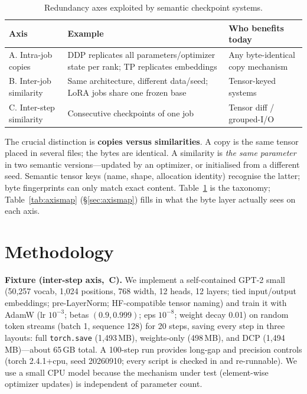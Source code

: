 \documentclass[sigconf,10pt,anonymous,review]{acmart}
\begin{document}
\begin{table}[t]
\caption{Redundancy axes exploited by semantic checkpoint systems.}
\label{tab:taxonomy}
\small
\begin{tabular}{p{1.1cm}p{3.05cm}p{2.9cm}}
\toprule
\textbf{Axis} & \textbf{Example} & \textbf{Who benefits today} \\
\midrule
A. Intra-job copies & DDP replicates all parameters/optimizer state per
rank; TP replicates embeddings & Any byte-identical copy mechanism \\
B. Inter-job similarity & Same architecture, different data/seed; LoRA
jobs share one frozen base & Tensor-keyed systems~\cite{adacheck} \\
C. Inter-step similarity & Consecutive checkpoints of one job & Tensor
diff / grouped-I/O~\cite{adacheck,aiturbo} \\
\bottomrule
\end{tabular}
\end{table}

The crucial distinction is \textbf{copies versus similarities}. A copy is
the same tensor placed in several files; the bytes are identical. A
similarity is \emph{the same parameter} in two semantic versions---updated
by an optimizer, or initialised from a different seed. Semantic tensor
keys (name, shape, allocation identity) recognise the latter; byte
fingerprints can only match exact content. Table~\ref{tab:taxonomy} is the
taxonomy; Table~\ref{tab:axismap} (\S\ref{sec:axismap}) fills in what the
byte layer actually sees on each axis.

\section{Methodology}
\label{sec:methodology}

\textbf{Fixture (inter-step axis,~C).} We implement a self-contained
GPT-2 small (50,257 vocab, 1,024 positions, 768 width, 12 heads, 12
layers; tied input/output embeddings; pre-LayerNorm; HF-compatible tensor
naming) and train it with AdamW (lr $10^{-3}$; betas $(0.9, 0.999)$;
eps $10^{-8}$; weight decay 0.01) on random token streams (batch 1,
sequence 128) for 20 steps, saving every step in three layouts: full
\texttt{torch.save} (1,493\,MB), weights-only (498\,MB), and DCP
(1,494\,MB)---about 65\,GB total. A 100-step run provides long-gap and
precision controls (torch 2.4.1+cpu, seed 20260910; every script is
checked in and re-runnable). We use a small CPU model because the
mechanism under test (element-wise optimizer updates) is independent of
parameter count.
\end{document}
